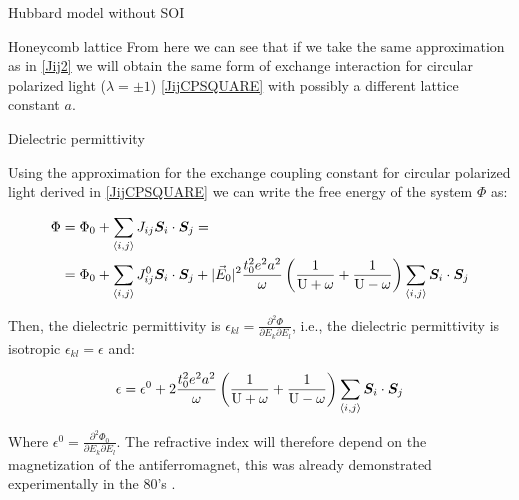 \begin{section}{Hubbard model without SOI}
\begin{subsection}{Honeycomb lattice}
From here we can see that if we take the same approximation as in \ref{Jij2} we will obtain the same form of exchange interaction for circular polarized light ($\lambda=\pm1$) \ref{JijCPSQUARE} with possibly a different lattice constant $a$. 

\end{subsection}

\begin{subsection}{Dielectric permittivity}

Using the approximation for the exchange coupling constant for circular polarized light derived in \ref{JijCPSQUARE} we can write the free energy of the system $\Phi$ as:

\begin{align}
\Phi &= \Phi_0 + \sum_{\langle i,j \rangle} J_{ij} \boldsymbol{S}_i \cdot \boldsymbol{S}_j = \nonumber \\
&= \Phi_0 + \sum_{\langle i,j \rangle} J_{ij}^0 \boldsymbol{S}_i \cdot \boldsymbol{S}_j + |\vec{E}_0|^2 \frac{t_0^2 e^2 a^2}{\omega}\left( \frac{1}{\text{U}+\omega} + \frac{1}{\text{U}-\omega} \right)\sum_{\langle i,j \rangle} \boldsymbol{S}_i \cdot \boldsymbol{S}_j
\end{align}

Then, the dielectric permittivity is $\epsilon_{kl} = \frac{\partial^2 \Phi}{\partial E_k \partial E_l}$, i.e., the dielectric permittivity is isotropic $\epsilon_{kl} = \epsilon$ and:

\begin{equation}
\epsilon = \epsilon^0 + 2\frac{t_0^2 e^2 a^2}{\omega}\left( \frac{1}{\text{U}+\omega} + \frac{1}{\text{U}-\omega} \right)\sum_{\langle i,j \rangle} \boldsymbol{S}_i \cdot \boldsymbol{S}_j
\end{equation}

Where $\epsilon^0 = \frac{\partial^2 \Phi_0}{\partial E_k \partial E_l}$. The refractive index will therefore depend on the magnetization of the antiferromagnet, this was already demonstrated experimentally in the 80's \cite{Demokritov1985}.
\end{subsection}

\end{section}
